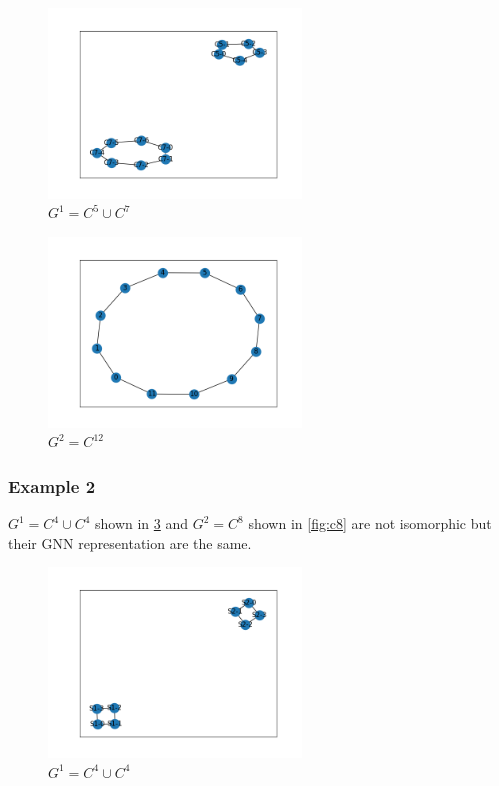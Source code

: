 \documentclass[a4paper]{article}
\begin{document}
\begin{figure}[ht]
    \centering
    \includegraphics[width=0.6\textwidth]{figures/c5_u_c7.png}
    \caption{$G^1 =C^5 \cup C^7$}
    \label{fig:c5_u_c7}
\end{figure}

\begin{figure}[ht]
    \centering
    \includegraphics[width=0.6\textwidth]{figures/c12.png}
    \caption{$G^2 =C^{12}$}
    \label{fig:c12}
\end{figure}

\subsubsection*{Example 2}
$G^1 =C^4 \cup C^4$ shown in \ref{fig:c4_u_c4} and $G^2 =C^8$ shown in \ref{fig:c8} are not isomorphic but their GNN representation are the same.
\begin{figure}[ht]
    \centering
    \includegraphics[width=0.6\textwidth]{figures/C4_u_C4.png}
    \caption{$G^1 =C^4 \cup C^4$}
    \label{fig:c4_u_c4}
\end{figure}
\end{document}
